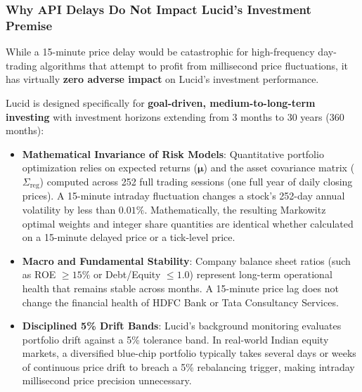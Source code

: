 \subsubsection{Why API Delays Do Not Impact Lucid's Investment Premise}
While a 15-minute price delay would be catastrophic for high-frequency day-trading algorithms that attempt to profit from millisecond price fluctuations, it has virtually \textbf{zero adverse impact} on Lucid's investment performance. 

Lucid is designed specifically for \textbf{goal-driven, medium-to-long-term investing} with investment horizons extending from 3 months to 30 years (360 months):
\begin{itemize}
    \item \textbf{Mathematical Invariance of Risk Models}: Quantitative portfolio optimization relies on expected returns ($\boldsymbol{\mu}$) and the asset covariance matrix ($\Sigma_{\text{reg}}$) computed across 252 full trading sessions (one full year of daily closing prices). A 15-minute intraday fluctuation changes a stock's 252-day annual volatility by less than $0.01\%$. Mathematically, the resulting Markowitz optimal weights and integer share quantities are identical whether calculated on a 15-minute delayed price or a tick-level price.
    \item \textbf{Macro and Fundamental Stability}: Company balance sheet ratios (such as ROE $\ge 15\%$ or Debt/Equity $\le 1.0$) represent long-term operational health that remains stable across months. A 15-minute price lag does not change the financial health of HDFC Bank or Tata Consultancy Services.
    \item \textbf{Disciplined 5\% Drift Bands}: Lucid's background monitoring evaluates portfolio drift against a 5\% tolerance band. In real-world Indian equity markets, a diversified blue-chip portfolio typically takes several days or weeks of continuous price drift to breach a 5\% rebalancing trigger, making intraday millisecond price precision unnecessary.
\end{itemize}

